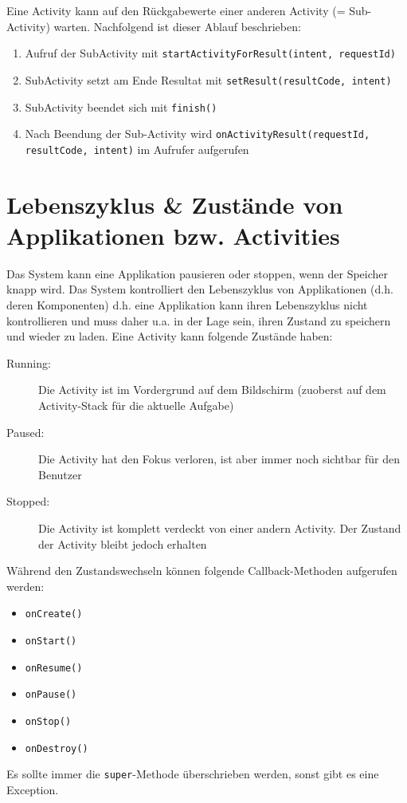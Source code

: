 Eine Activity kann auf den Rückgabewerte einer anderen Activity (= Sub-Activity) warten. Nachfolgend ist dieser Ablauf beschrieben:
\begin{enumerate}
	\item Aufruf der SubActivity mit \texttt{startActivityForResult(intent, requestId)}
	\item SubActivity setzt am Ende Resultat mit \texttt{setResult(resultCode, intent)}
	\item SubActivity beendet sich mit \texttt{finish()}
	\item Nach Beendung der Sub-Activity wird \texttt{onActivityResult(requestId, resultCode, intent)} im Aufrufer aufgerufen
\end{enumerate}

\section{Lebenszyklus \& Zustände von Applikationen bzw. Activities}

Das System kann eine Applikation pausieren oder stoppen, wenn der Speicher knapp wird. Das System kontrolliert den Lebenszyklus von Applikationen (d.h. deren Komponenten) d.h. eine Applikation kann ihren Lebenszyklus nicht kontrollieren und muss daher u.a. in der Lage sein, ihren Zustand zu speichern und wieder zu laden. 
Eine Activity kann folgende Zustände haben:
\begin{description}
	\item[Running:]	Die Activity ist im Vordergrund auf dem Bildschirm (zuoberst auf dem Activity-Stack	für die aktuelle Aufgabe)
	\item[Paused:] Die Activity hat den Fokus verloren, ist aber	immer noch sichtbar für den Benutzer
	\item[Stopped:] Die Activity ist komplett verdeckt von einer	andern Activity. Der Zustand der Activity bleibt jedoch erhalten
\end{description}
Während den Zustandswechseln können folgende Callback-Methoden aufgerufen werden:
\begin{itemize}
	\item \texttt{onCreate()}
	\item \texttt{onStart()}
	\item \texttt{onResume()}	
	\item \texttt{onPause()}	
	\item \texttt{onStop()}	
	\item \texttt{onDestroy()}	
\end{itemize}
Es sollte immer die \texttt{super}-Methode überschrieben werden, sonst gibt es eine Exception.

